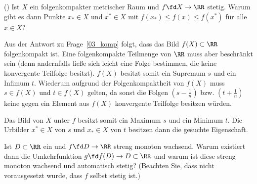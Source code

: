 \begin{frage}\label{mima}
  ()
  Ist $X$ ein folgenkompakter metrischer Raum und $f\fd X\to\RR$ stetig. 
  Warum gibt es dann Punkte $x_{\ast}\in X$ und $x^{\ast} \in X$ mit 
  $f(x_{\ast}) \le f(x) \le f(x^{\ast})$ für alle $x\in X$?
\end{frage}

\begin{antwort}
  Aus der Antwort zu Frage~\ref{03_komp} folgt, dass das Bild 
  $f(X) \subset \RR$ folgenkompakt ist. 
  Eine folgenkompakte Teilmenge von $\RR$ muss aber 
  beschränkt sein (denn andernfalls ließe sich leicht eine Folge bestimmen, 
  die keine konvergente Teilfolge besitzt). 
  $f(X)$ besitzt somit ein Supremum $s$ und ein Infimum $t$. Wiederum aufgrund 
  der Folgenkompaktheit von $f(X)$ muss $s\in f(X)$ und $t\in f(X)$ gelten, da 
  sonst die Folgen $\left(s-\frac1n\right)$ bzw. $\left(t+\frac1n\right)$ keine gegen ein Element aus $f(X)$ 
  konvergente Teilfolge besitzen würden.

  Das Bild von $X$ unter $f$ besitzt somit ein Maximum 
  $s$ und ein Minimum $t$. Die Urbilder $x^{\ast}\in X$ von $s$ und 
  $x_{\ast}\in X$ von $t$ besitzen dann die gesuchte Eigenschaft.
  \AntEnd
\end{antwort}

\begin{frage}\label{03_umke}
  Ist $D\subset \RR$ ein  und $f\fd D\to\RR$ 
  streng monoton wachsend. Warum existiert dann die Umkehrfunktion 
  $g\fd f(D) \to D\subset \RR$ und warum ist diese streng monoton 
  wachsend und automatisch stetig?
  (Beachten Sie, dass nicht vorausgesetzt wurde, dass $f$ selbst stetig ist.)
\end{frage}

